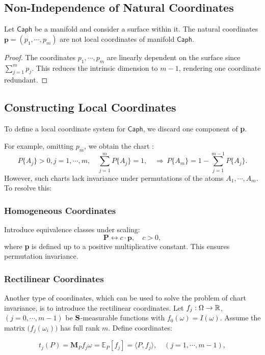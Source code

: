 \subsection{Non-Independence of Natural Coordinates}
\begin{remark}
Let  $\mathsf{Caph}$  be a manifold and consider a surface within it. The natural coordinates $\mathbf{p}=(p_1,\cdots,p_m)$ are not local coordinates of manifold $\mathsf{Caph}$.
\end{remark}
\begin{proof}
 The coordinates  $p_1,\cdots,p_m$ are linearly dependent on the surface since $\sum_{j=1}^mp_j$. This reduces the intrinsic dimension to 
$m-1$, rendering one coordinate redundant.
 \end{proof}
 \subsection{Constructing Local Coordinates}
To define a local coordinate system for $\mathsf{Caph}$, we discard one component of {\bf p}.

For example, omitting $p_m$, we obtain the chart :
\[
P\{A_j\} > 0, j=1,\cdots,m, \quad  \sum_{j=1}^m P\{A_j\} =1,\quad \Longrightarrow\, P\{A_m\}=1-\sum_{j=1}^{m-1} P\{A_j\}.
\]
However, such charts lack invariance under permutations of the atoms $A_1,\cdots, A_m$. To resolve this:


\subsubsection*{Homogeneous Coordinates}
Introduce equivalence classes under scaling:
\[
\mathbf{P} \longleftrightarrow c \cdot \mathbf{p},\quad c>0,
\]
where {\bf p} is defined up to a positive multiplicative constant. This ensures permutation invariance.


\subsubsection*{Rectilinear Coordinates}

Another type of coordinates, which can be used to solve the problem of chart invariance, is to introduce the rectilinear coordinates.
Let  $f_j:\Omega\to \mathbb{R}$, $(j=0,\cdots,m-1)$ be ${\bf S}$-measurable functions with $f_0(\omega)=I(\omega)$. Assume the matrix $\bigg(f_j(\omega_i)\bigg)$ 
has full rank $m$. Define coordinates:

\[
t_j(P)= \mathbf{M}_P f_j{\omega}= \mathbb{E}_P[f_j] = \langle P,f_j \rangle, \quad (j= 1,\cdots,m-1),
\]

